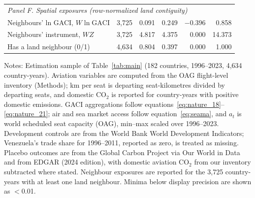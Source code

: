 \documentclass[12pt]{extarticle}
\begin{document}
\begin{table}[H]
{\begin{threeparttable}
\begin{tabular}{lrrrrr}
\multicolumn{6}{l}{\textit{Panel F. Spatial exposures (row-normalized land contiguity)}} \\
  Neighbours' ln GACI, $W\ln\mathrm{GACI}$ & 3,725 & 0.091 & 0.249 & $-$0.396 & 0.858 \\
  Neighbours' instrument, $WZ$ & 3,725 & 4.817 & 4.375 & 0.000 & 14.373 \\
  Has a land neighbour (0/1) & 4,634 & 0.804 & 0.397 & 0.000 & 1.000 \\
\bottomrule
\end{tabular}
\begin{tablenotes}[flushleft]
\scriptsize
\item Notes: Estimation sample of Table~\ref{tab:main} (182 countries, 1996--2023, 4,634 country-years). Aviation variables are computed from the OAG flight-level inventory (Methods); km per seat is departing seat-kilometres divided by departing seats, and domestic CO$_2$ is reported for country-years with positive domestic emissions. GACI aggregations follow equations~\ref{eq:nature_18}--\ref{eq:nature_21}; air and sea market access follow equation~\ref{eq:seama}, and $a_t$ is world scheduled seat capacity (OAG), min--max scaled over 1996--2023. Development controls are from the World Bank World Development Indicators; Venezuela's trade share for 1996--2011, reported as zero, is treated as missing. Placebo outcomes are from the Global Carbon Project via Our World in Data and from EDGAR (2024 edition), with domestic aviation CO$_2$ from our inventory subtracted where stated. Neighbour exposures are reported for the 3,725 country-years with at least one land neighbour. Minima below display precision are shown as $<$0.01.
\end{tablenotes}
\end{threeparttable}}
\end{table}
\end{document}
